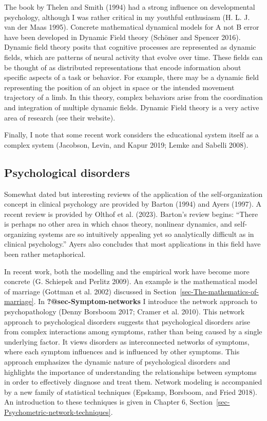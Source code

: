 \documentclass[
  a4paper,
  DIV=11,
  numbers=noendperiod,
  oneside]{scrreprt}
\begin{document}
The book by Thelen and Smith (1994) had a strong influence on
developmental psychology, although I was rather critical in my youthful
enthusiasm (H. L. J. van der Maas 1995). Concrete mathematical dynamical
models for A not B error have been developed in Dynamic Field theory
(Schöner and Spencer 2016). Dynamic field theory posits that cognitive
processes are represented as dynamic fields, which are patterns of
neural activity that evolve over time. These fields can be thought of as
distributed representations that encode information about specific
aspects of a task or behavior. For example, there may be a dynamic field
representing the position of an object in space or the intended movement
trajectory of a limb. In this theory, complex behaviors arise from the
coordination and integration of multiple dynamic fields. Dynamic Field
theory is a very active area of research (see their website).

Finally, I note that some recent work considers the educational system
itself as a complex system (Jacobson, Levin, and Kapur 2019; Lemke and
Sabelli 2008).

\hypertarget{sec-Psychological-disorders}{%
\subsection{Psychological disorders}\label{sec-Psychological-disorders}}

Somewhat dated but interesting reviews of the application of the
self-organization concept in clinical psychology are provided by Barton
(1994) and Ayers (1997). A recent review is provided by Olthof et al.
(2023). Barton's review begins: ``There is perhaps no other area in
which chaos theory, nonlinear dynamics, and self-organizing systems are
so intuitively appealing yet so analytically difficult as in clinical
psychology.'' Ayers also concludes that most applications in this field
have been rather metaphorical.

In recent work, both the modelling and the empirical work have become
more concrete (G. Schiepek and Perlitz 2009). An example is the
mathematical model of marriage (Gottman et al. 2002) discussed in
Section~\ref{sec-The-mathematics-of-marriage}. In
\textbf{?@sec-Symptom-networks} I introduce the network approach to
psychopathology (Denny Borsboom 2017; Cramer et al. 2010). This network
approach to psychological disorders suggests that psychological
disorders arise from complex interactions among symptoms, rather than
being caused by a single underlying factor. It views disorders as
interconnected networks of symptoms, where each symptom influences and
is influenced by other symptoms. This approach emphasizes the dynamic
nature of psychological disorders and highlights the importance of
understanding the relationships between symptoms in order to effectively
diagnose and treat them. Network modeling is accompanied by a new family
of statistical techniques (Epskamp, Borsboom, and Fried 2018). An
introduction to these techniques is given in Chapter 6,
Section~\ref{sec-Psychometric-network-techniques}.
\end{document}
